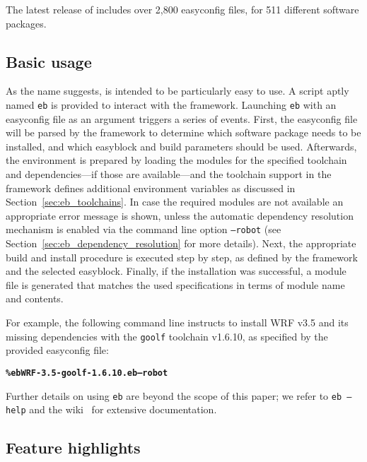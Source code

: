 The latest release of \easybuild{} includes over 2,800 easyconfig files, for
511 different software packages. 

\subsection{Basic usage}
\label{sec:eb_basic_usage}

As the name suggests, \easybuild{} is intended to be particularly easy to use. A script aptly named
\texttt{\small eb} is provided to interact with the \easybuild{} framework.
Launching \texttt{\small eb} with an easyconfig file as an argument triggers a
series of events. First, the easyconfig file will be parsed by the \easybuild{}
framework to determine which software package needs to be installed, and which
easyblock and build parameters should be used. Afterwards, the environment is
prepared by loading the modules for the specified toolchain and dependencies---if
those are available---and the toolchain support in the framework defines additional
environment variables as discussed in Section~\ref{sec:eb_toolchains}. In case the
required modules are not available an appropriate error message is shown, unless
the automatic dependency resolution mechanism is enabled via the command line option
\texttt{\small --robot} (see Section~\ref{sec:eb_dependency_resolution} for more
details). Next,
the appropriate build and install procedure is executed step by step, as defined by
the framework and the selected easyblock. Finally, if the installation was successful, a module file is generated that
matches the used specifications in terms of module name and contents.

For example, the following command line instructs \easybuild{} to install WRF v3.5
and its missing dependencies with the \texttt{\small goolf} toolchain v1.6.10, as
specified by the provided easyconfig file:

{\small
\begin{alltt}
    \textbf{\% eb WRF-3.5-goolf-1.6.10.eb --robot}
\end{alltt}
}
\noindent
Further details on using \texttt{\small eb} are beyond the scope of this paper; we
refer to \texttt{\small eb --help} and the \easybuild{} wiki~\cite{ebwiki} for
extensive documentation.

\subsection{Feature highlights}
\label{sec:eb_features}

